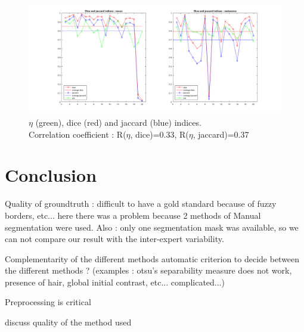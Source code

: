 \documentclass[a4paper,10pt]{article}
\begin{document}
\begin{figure}
\centering
\includegraphics[width=0.9\linewidth]{../results/otsu-dice-jaccard-eta-plot}
\caption{$\eta$ (green), dice (red) and jaccard (blue) indices.\\ Correlation coefficient : R($\eta$, dice)=0.33, R($\eta$, jaccard)=0.37 }
\label{fig:eta-correlation}
\end{figure}


\section*{Conclusion}
 Quality of groundtruth : difficult to have a gold standard because of fuzzy borders, etc... here there was a problem because 2 methods of Manual segmentation were used. Also : only one segmentation mask was available, so we can not compare our result with the inter-expert variability.

 Complementarity of the different methods
 automatic criterion to decide between the different methods ? (examples : otsu's separability measure does not work, presence of hair, global initial contrast, etc... complicated...)
 
 Preprocessing is critical
 
discuss quality of the method used





\end{document}

